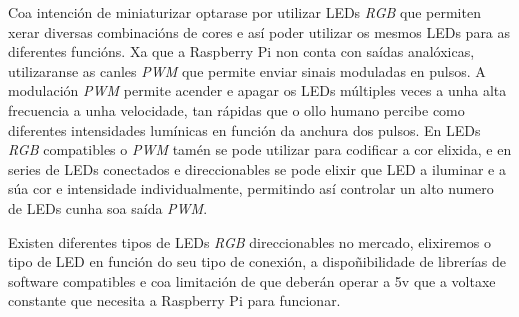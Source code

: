 Coa intención de miniaturizar optarase por utilizar LEDs \emph{RGB} que permiten xerar diversas combinacións de cores e así poder utilizar os mesmos LEDs para as diferentes funcións.
Xa que a Raspberry Pi non conta con saídas analóxicas, utilizaranse as canles \emph{PWM} que permite enviar sinais moduladas en pulsos. A modulación \emph{PWM} permite acender e apagar os LEDs múltiples veces a unha alta frecuencia a unha velocidade, tan rápidas que o ollo humano percibe como diferentes intensidades lumínicas en función da anchura dos pulsos. En LEDs \emph{RGB} compatibles o \emph{PWM} tamén se pode utilizar para codificar a cor elixida, e en series de LEDs conectados e direccionables se pode elixir que LED a iluminar e a súa cor e intensidade individualmente, permitindo así controlar un alto numero de LEDs cunha soa saída \emph{PWM}.

Existen diferentes tipos de LEDs \emph{RGB} direccionables no mercado, elixiremos o tipo de LED en función do seu tipo de conexión, a dispoñibilidade de librerías de software compatibles e coa limitación de que deberán operar a 5v que a voltaxe constante que necesita a Raspberry Pi para funcionar.\\

